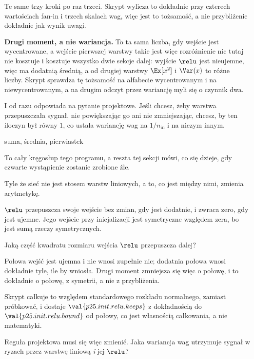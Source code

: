 \begin{fr}

Te same trzy kroki po raz trzeci. Skrypt wylicza to dokładnie przy czterech
wartościach fan-in i trzech skalach wag, więc jest to tożsamość, a nie
przybliżenie \dash{} dokładnie jak wynik uwagi.

\begin{note}
\textbf{Drugi moment, a nie wariancja.} To ta sama liczba, gdy wejście jest
wycentrowane, a wejście pierwszej warstwy takie jest \dash{} więc rozróżnienie
nic tutaj nie kosztuje i kosztuje wszystko dwie sekcje dalej: wyjście $\relu$
jest nieujemne, więc ma dodatnią średnią, a od drugiej warstwy $\Ex[x^{2}]$ i
$\Var(x)$ to różne liczby. Skrypt sprawdza tę tożsamość na alfabecie
wycentrowanym i na niewycentrowanym, a na drugim odczyt przez wariancję myli
się o czynnik dwa.
\end{note}

I od razu odpowiada na pytanie projektowe. Jeśli chcesz, żeby warstwa
przepuszczała sygnał, nie powiększając go ani nie zmniejszając, chcesz, by ten
iloczyn był równy $1$, co ustala wariancję wag na
$1/n_{\text{in}}$ i na niczym innym.
\end{fr}

\begin{fr}
%
{suma, średnia, pierwiastek}

To cały kręgosłup tego programu, a reszta tej sekcji mówi, co się dzieje, gdy
czwarte wystąpienie zostanie zrobione źle.
\end{fr}

\begin{fr}
Tyle że sieć nie jest stosem warstw liniowych, a to, co jest między nimi,
zmienia arytmetykę.

$\relu$ przepuszcza swoje wejście bez zmian, gdy jest dodatnie, i zwraca zero,
gdy jest ujemne. Jego wejście przy inicjalizacji jest symetryczne względem
zera, bo jest sumą rzeczy symetrycznych.

Jaką część kwadratu rozmiaru wejścia $\relu$ przepuszcza dalej?
\dotline
\nextframe
\end{fr}

\begin{fr}

Połowa wejść jest ujemna i nie wnosi zupełnie nic; dodatnia połowa wnosi
dokładnie tyle, ile by wniosła. Drugi moment zmniejsza się więc o połowę, i to
dokładnie o połowę, z symetrii, a nie z przybliżenia.

Skrypt całkuje to względem standardowego rozkładu normalnego, zamiast
próbkować, i dostaje $\val{p25.init.relu.keeps}$ \dash{} z dokładnością do
$\val{p25.init.relu.bound}$ od połowy, co jest własnością całkowania, a nie
matematyki.

Reguła projektowa musi się więc zmienić. Jaka wariancja wag utrzymuje sygnał
w ryzach przez warstwę liniową \emph{i} jej $\relu$?
\dotline
\nextframe
\end{fr}

